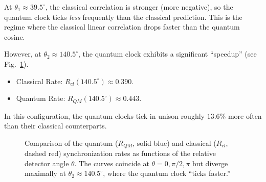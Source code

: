 \documentclass[entropy,article,submit,moreauthors,pdftex]{Definitions/mdpi}
\begin{document}
At $\theta_1 \approx 39.5^\circ$, the classical correlation is stronger (more negative), so the quantum clock ticks \emph{less} frequently than the classical prediction. This is the regime where the classical linear correlation drops faster than the quantum cosine.

However, at $\theta_2 \approx 140.5^\circ$, the quantum clock exhibits a significant ``speedup'' (see Fig.~\ref{fig:rates}).
\begin{itemize}
    \item Classical Rate: $R_{cl}(140.5^\circ) \approx 0.390$.
    \item Quantum Rate: $R_{QM}(140.5^\circ) \approx 0.443$.
\end{itemize}
In this configuration, the quantum clocks tick in unison roughly $13.6\%$ more often than their classical counterparts.

\begin{figure}[t]
\centering
{}
\caption{Comparison of the quantum ($R_{QM}$, solid blue) and classical ($R_{cl}$, dashed red) synchronization rates as functions of the relative detector angle $\theta$. The curves coincide at $\theta = 0, \pi/2, \pi$ but diverge maximally at $\theta_2 \approx 140.5^\circ$, where the quantum clock ``ticks faster.''}
\label{fig:rates}
\end{figure}
\end{document}

